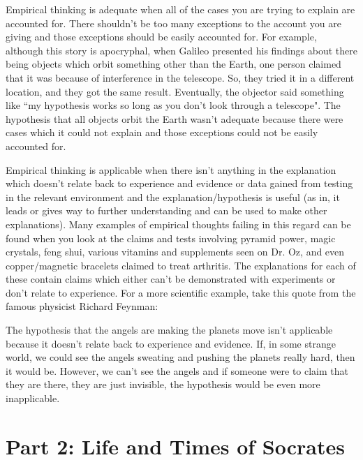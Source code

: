 Empirical thinking is adequate when all of the cases you are trying to explain are accounted for. There shouldn't be too many exceptions to the account you are giving and those exceptions should be easily accounted for. For example, although this story is apocryphal, when Galileo presented his findings about there being objects which orbit something other than the Earth, one person claimed that it was because of interference in the telescope. So, they tried it in a different location, and they got the same result. Eventually, the objector said something like ``my hypothesis works so long as you don't look through a telescope". The hypothesis that all objects orbit the Earth wasn't adequate because there were cases which it could not explain and those exceptions could not be easily accounted for. 

Empirical thinking is applicable when there isn't anything in the explanation which doesn't relate back to experience and evidence or data gained from testing in the relevant environment and the explanation/hypothesis is useful (as in, it leads or gives way to further understanding and can be used to make other explanations). Many examples of empirical thoughts failing in this regard can be found when you look at the claims and tests involving pyramid power, magic crystals, feng shui, various vitamins and supplements seen on Dr. Oz, and even copper/magnetic bracelets claimed to treat arthritis. The explanations for each of these contain claims which either can't be demonstrated with experiments or don't relate to experience. For a more scientific example, take this quote from the famous physicist Richard Feynman:

 The hypothesis that the angels are making the planets move isn't applicable because it doesn't relate back to experience and evidence. If, in some strange world, we could see the angels sweating and pushing the planets really hard, then it would be. However, we can't see the angels and if someone were to claim that they are there, they are just invisible, the hypothesis would be even more inapplicable.



\chapter{Part 2: Life and Times of Socrates}

